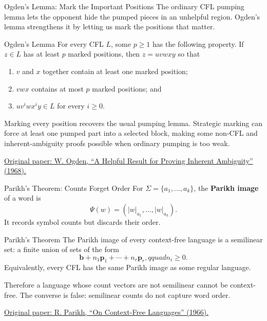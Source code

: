 \documentclass[10pt]{beamer}
\newcommand{\paperlink}[2]{%
  \href{#1}{\textcolor{blue!65!black}{#2}}%
}
\begin{document}
\begin{frame}{Ogden's Lemma: Mark the Important Positions}
  \footnotesize
  The ordinary CFL pumping lemma lets the opponent hide the pumped pieces in
  an unhelpful region. Ogden's lemma strengthens it by letting us mark the
  positions that matter.
  \pause
  \begin{block}{Ogden's Lemma}
    For every CFL $L$, some $p\ge1$ has the following property. If
    $z\in L$ has at least $p$ marked positions, then
    $z=uvwxy$ so that
    \begin{enumerate}
      \item $v$ and $x$ together contain at least one marked position;
      \item $vwx$ contains at most $p$ marked positions; and
      \item $uv^iwx^iy\in L$ for every $i\ge0$.
    \end{enumerate}
  \end{block}
  \pause
  Marking every position recovers the usual pumping lemma. Strategic marking
  can force at least one pumped part into a selected block, making some
  non-CFL and inherent-ambiguity proofs possible when ordinary pumping is too
  weak.

  \paperlink{https://doi.org/10.1007/BF01694004}{Original paper: W. Ogden,
  ``A Helpful Result for Proving Inherent Ambiguity'' (1968).}
\end{frame}

\begin{frame}{Parikh's Theorem: Counts Forget Order}
  \small
  For $\Sigma=\{a_1,\ldots,a_k\}$, the \textbf{Parikh image} of a word is
  \[
    \Psi(w)=(|w|_{a_1},\ldots,|w|_{a_k}).
  \]
  It records symbol counts but discards their order.
  \pause
  \begin{block}{Parikh's Theorem}
    The Parikh image of every context-free language is a semilinear set: a
    finite union of sets of the form
    \[
      \mathbf b+n_1\mathbf p_1+\cdots+n_r\mathbf p_r,qquad n_i\ge0.
    \]
    Equivalently, every CFL has the same Parikh image as some regular
    language.
  \end{block}
  \pause
  Therefore a language whose count vectors are not semilinear cannot be
  context-free. The converse is false: semilinear counts do not capture word
  order.

  \paperlink{https://doi.org/10.1145/321356.321364}{Original paper: R. Parikh,
  ``On Context-Free Languages'' (1966).}
\end{frame}
\end{document}
